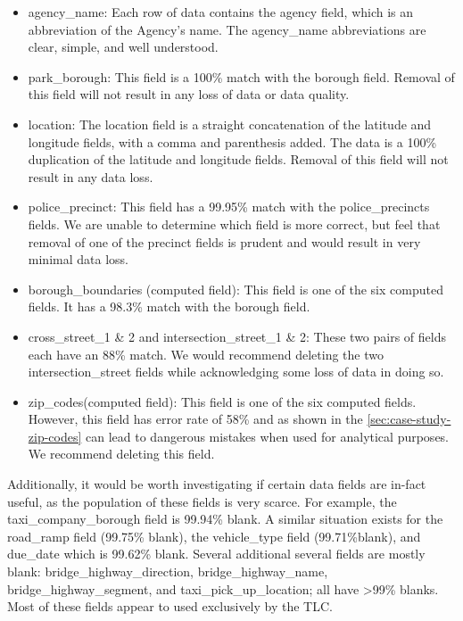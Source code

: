 \documentclass[12pt, titlepage]{article}
\begin{document}
 
\begin{itemize}
	\item agency\_name: Each row of data contains the agency field, 
	which is an abbreviation of the Agency's name. The agency\_name 
	abbreviations are clear, simple, and well understood.
		    
	\item park\_borough:  This field is a 100\% match with the 
	borough field. Removal of this field will not result in any loss of 
	data or data quality.
		    
	\item location:  The location field is a straight concatenation of 
	the latitude and longitude fields, with a comma and parenthesis 
	added. The data is a 100\% duplication of the latitude 
	and longitude fields. Removal of this field will not 
	result in any data loss.
		    
	\item police\_precinct: This field has a 99.95\% match with the 
	police\_precincts fields. We are unable to determine which field 
	is more correct, but feel that removal of one of the precinct fields 
	is prudent and would result in very minimal data loss.
		   
	\item borough\_boundaries (computed field): This field is one of 
	the six computed fields. It has a 98.3\% match with the borough 
	field.
		    
	\item cross\_street\_1 \& 2 and intersection\_street\_1 \& 2: These 
	two pairs of fields each have an 88\% match. We would recommend 
	deleting the two intersection\_street fields while acknowledging 
	some loss of data in doing so.
		     
	\item zip\_codes(computed field):  This field is one of the six 
	computed fields.  However, this field has error rate of 58\% and 
	as shown in the \ref{sec:case-study-zip-codes} can lead to 
	dangerous mistakes when used for analytical purposes. 
	We recommend deleting this field.
\end{itemize}
 	
 	
Additionally, it would be worth investigating if certain data fields are 
in-fact useful, as the population of these fields is very scarce. For 
example, the taxi\_company\_borough field is 99.94\% 
blank. A similar situation exists for the road\_ramp field 
(99.75\% blank), the vehicle\_type field (99.71\%blank), and 
due\_date which is 99.62\% blank. Several additional several fields
are mostly blank: bridge\_highway\_direction, bridge\_highway\_name, 
bridge\_highway\_segment, and taxi\_pick\_up\_location; all 
have \textgreater99\% blanks. Most of these fields 
appear to used exclusively by the TLC.   
\end{document}
